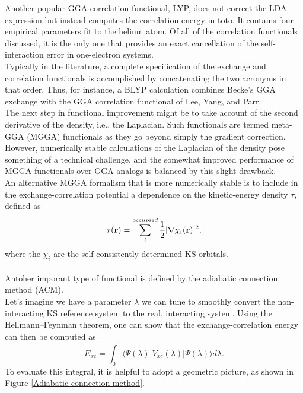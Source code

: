 Another popular GGA correlation functional, LYP, does not correct the LDA expression but instead computes the correlation energy in toto. It contains four empirical parameters fit to the helium atom. Of all of the correlation functionals discussed, it is the only one that provides an exact cancellation of the self-interaction error in one-electron systems. \\
Typically in the literature, a complete specification of the exchange and correlation functionals is accomplished by concatenating the two acronyms in that order. Thus, for instance, a BLYP calculation combines Becke’s GGA exchange with the GGA correlation functional of Lee, Yang, and Parr. \\
The next step in functional improvement might be to take account of the second derivative of the density, i.e., the Laplacian. Such functionals are termed meta-GGA (MGGA) functionals as they go beyond simply the gradient correction. However, numerically stable calculations of the Laplacian of the density pose something of a technical challenge, and the somewhat improved performance of MGGA functionals over GGA analogs is balanced by this slight drawback. \\
An alternative MGGA formalism that is more numerically stable is to include in the exchange-correlation potential a dependence on the kinetic-energy density $\tau$, defined as
\begin{equation}
    \tau ({\bf r}) = \sum_i^{occupied} \frac{1}{2} |\nabla \chi_i ({\bf r})|^2,
\end{equation}
where the $\chi_i$ are the self-consistently determined KS orbitals. \\
\\
Antoher imporant type of functional is defined by the adiabatic connection method (ACM). \\
Let's imagine we have a parameter $\lambda$ we can tune to smoothly convert the non-interacting KS reference system to the real, interacting system. Using the Hellmann–Feynman theorem, one can show that the exchange-correlation energy can then be computed as
\begin{equation}
    E_{xc} = \int_0^1 \langle\Psi(\lambda)|V_{xc}(\lambda)|\Psi(\lambda)\rangle d\lambda.
\end{equation}
To evaluate this integral, it is helpful to adopt a geometric picture, as shown in Figure \ref{Adiabatic connection method}.
